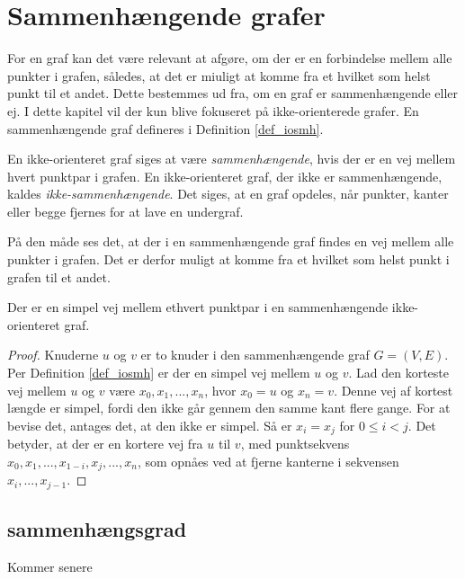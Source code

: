 \section{Sammenhængende grafer}
For en graf kan det være relevant at afgøre, om der er en forbindelse mellem alle punkter i grafen, således, at det er miuligt at komme fra et hvilket som helst punkt til et andet. Dette bestemmes ud fra, om en graf er sammenhængende eller ej.
I dette kapitel vil der kun blive fokuseret på ikke-orienterede grafer.
En sammenhængende graf defineres i Definition \ref{def_iosmh}.

\begin{defn}
\label{def_iosmh}
En ikke-orienteret graf siges at være \textit{sammenhængende}, hvis der er en vej mellem hvert punktpar i grafen. 
En ikke-orienteret graf, der ikke er sammenhængende, kaldes \textit{ikke-sammenhængende}.
Det siges, at en graf opdeles, når punkter, kanter eller begge fjernes for at lave en undergraf. 
\end{defn}

\noindent På den måde ses det, at der i en sammenhængende graf findes en vej mellem alle punkter i grafen. 
Det er derfor muligt at komme fra et hvilket som helst punkt i grafen til et andet.

\begin{thm}
Der er en simpel vej mellem ethvert punktpar i en sammenhængende ikke-orienteret graf.
\label{smh_satning}
\end{thm}

\begin{proof}
Knuderne $u$ og $v$ er to knuder i den sammenhængende graf $G=(V,E)$.
Per Definition \ref{def_iosmh} er der en simpel vej mellem $u$ og $v$.
Lad den korteste vej mellem $u$ og $v$ være $x_0,x_1,...,x_n$, hvor $x_0=u$ og $x_n=v$.
Denne vej af kortest længde er simpel, fordi den ikke går gennem den samme kant flere gange. 
For at bevise det, antages det, at den ikke er simpel. 
Så er $x_i=x_j$ for $0 \leq i < j$.
Det betyder, at der er en kortere vej fra $u$ til $v$, med punktsekvens $x_0,x_1,...,x_{1-i},x_j,...,x_n$, som opnåes ved at fjerne kanterne i sekvensen $x_i,...,x_{j-1}$.
\end{proof}

\subsection{sammenhængsgrad}
Kommer senere

